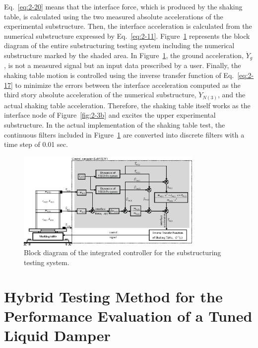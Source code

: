 Eq.~\eqref{eq:2-20} means that the interface force, which is produced by the shaking table, is calculated using the two measured absolute accelerations of the experimental substructure. Then, the interface acceleration is calculated from the numerical substructure expressed by Eq.~\eqref{eq:2-11}. Figure~\ref{fig:2-11} represents the block diagram of the entire substructuring testing system including the numerical substructure marked by the shaded area. In Figure~\ref{fig:2-11}, the ground acceleration, $\ddot{Y}_{g}$, is not a measured signal but an input data prescribed by a user. Finally, the shaking table motion is controlled using the inverse transfer function of Eq.~\eqref{eq:2-17} to minimize the errors between the interface acceleration computed as the third story absolute acceleration of the numerical substructure, $\ddot{Y}_{N(3)}$, and the actual shaking table acceleration. Therefore, the shaking table itself works as the interface node of Figure~\ref{fig:2-3b} and excites the upper experimental substructure. In the actual implementation of the shaking table test, the continuous filters included in Figure~\ref{fig:2-11} are converted into discrete filters with a time step of 0.01 sec.

\begin{figure}[ht]
\centering
\includegraphics[width=0.8\textwidth] {figure/2-11.eps}
\caption{Block diagram of the integrated controller for the substructuring testing system.}
\label{fig:2-11}
\end{figure}







\section{Hybrid Testing Method for the Performance Evaluation of a Tuned Liquid Damper}%
\label{chap:3}

